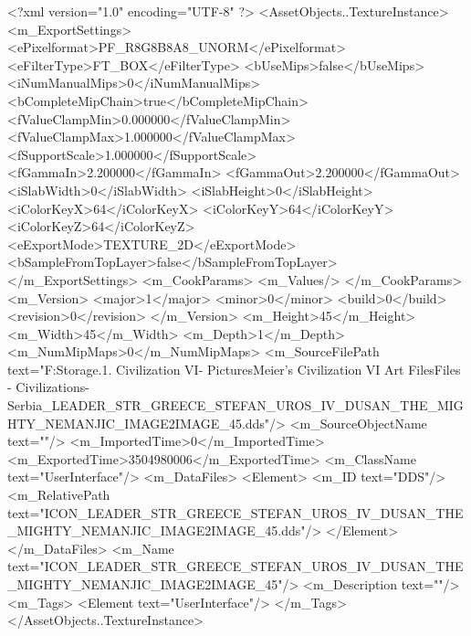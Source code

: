 <?xml version="1.0" encoding="UTF-8" ?>
<AssetObjects..TextureInstance>
	<m_ExportSettings>
		<ePixelformat>PF_R8G8B8A8_UNORM</ePixelformat>
		<eFilterType>FT_BOX</eFilterType>
		<bUseMips>false</bUseMips>
		<iNumManualMips>0</iNumManualMips>
		<bCompleteMipChain>true</bCompleteMipChain>
		<fValueClampMin>0.000000</fValueClampMin>
		<fValueClampMax>1.000000</fValueClampMax>
		<fSupportScale>1.000000</fSupportScale>
		<fGammaIn>2.200000</fGammaIn>
		<fGammaOut>2.200000</fGammaOut>
		<iSlabWidth>0</iSlabWidth>
		<iSlabHeight>0</iSlabHeight>
		<iColorKeyX>64</iColorKeyX>
		<iColorKeyY>64</iColorKeyY>
		<iColorKeyZ>64</iColorKeyZ>
		<eExportMode>TEXTURE_2D</eExportMode>
		<bSampleFromTopLayer>false</bSampleFromTopLayer>
	</m_ExportSettings>
	<m_CookParams>
		<m_Values/>
	</m_CookParams>
	<m_Version>
		<major>1</major>
		<minor>0</minor>
		<build>0</build>
		<revision>0</revision>
	</m_Version>
	<m_Height>45</m_Height>
	<m_Width>45</m_Width>
	<m_Depth>1</m_Depth>
	<m_NumMipMaps>0</m_NumMipMaps>
	<m_SourceFilePath text="F:\Mod Storage\2.1. Civilization VI\Mods\Archive - Pictures\Sid Meier's Civilization VI Art Files\Art Files - Civilizations\Civilization - Serbia\ICON_LEADER_STR_GREECE_STEFAN_UROS_IV_DUSAN_THE_MIGHTY_NEMANJIC_IMAGE2IMAGE_45.dds"/>
	<m_SourceObjectName text=""/>
	<m_ImportedTime>0</m_ImportedTime>
	<m_ExportedTime>3504980006</m_ExportedTime>
	<m_ClassName text="UserInterface"/>
	<m_DataFiles>
		<Element>
			<m_ID text="DDS"/>
			<m_RelativePath text="ICON_LEADER_STR_GREECE_STEFAN_UROS_IV_DUSAN_THE_MIGHTY_NEMANJIC_IMAGE2IMAGE_45.dds"/>
		</Element>
	</m_DataFiles>
	<m_Name text="ICON_LEADER_STR_GREECE_STEFAN_UROS_IV_DUSAN_THE_MIGHTY_NEMANJIC_IMAGE2IMAGE_45"/>
	<m_Description text=""/>
	<m_Tags>
		<Element text="UserInterface"/>
	</m_Tags>
</AssetObjects..TextureInstance>

